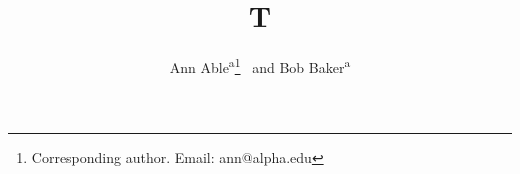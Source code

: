 \documentclass{article}
\begin{document}
\title{T}
\author{{Ann Able\textsuperscript{a}\thanks{Corresponding author. Email: ann@alpha.edu} ~and Bob Baker\textsuperscript{a}} }
\maketitle
\end{document}
